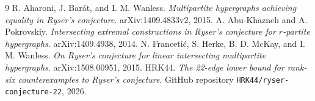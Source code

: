 \documentclass[10pt]{article}
\begin{document}
\begin{thebibliography}{9}
R. Aharoni, J. Bar\'at, and I. M. Wanless.
\emph{Multipartite hypergraphs achieving equality in Ryser's conjecture}.
arXiv:1409.4833v2, 2015.
A. Abu-Khazneh and A. Pokrovskiy.
\emph{Intersecting extremal constructions in Ryser's conjecture
for $r$-partite hypergraphs}. arXiv:1409.4938, 2014.
N. Franceti\'c, S. Herke, B. D. McKay, and I. M. Wanless.
\emph{On Ryser's conjecture for linear intersecting multipartite
hypergraphs}. arXiv:1508.00951, 2015.
HRK44. \emph{The 22-edge lower bound for rank-six counterexamples
to Ryser's conjecture}. GitHub repository \texttt{HRK44/ryser-conjecture-22}, 2026.
\end{thebibliography}
\end{document}

